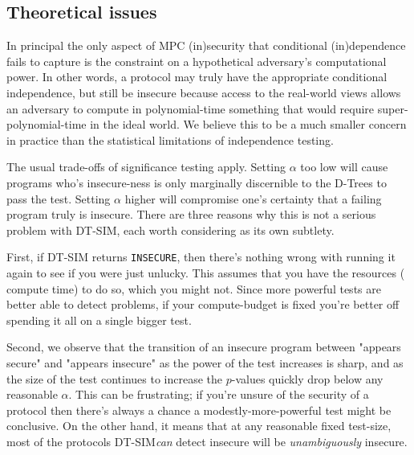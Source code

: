 \documentclass[compsoc, conference, a4paper, 10pt, times]{IEEEtran}
\newcommand{\toolname}{\textsc{DT-SIM}\xspace}
\begin{document}
\subsection{Theoretical issues}

In principal the only aspect of MPC (in)security that conditional (in)dependence fails to capture
is the constraint on a hypothetical adversary's computational power.
In other words, a protocol may truly have the appropriate conditional independence,
but still be insecure because access to the real-world views allows an adversary to compute in polynomial-time
something that would require super-polynomial-time in the ideal world.
We believe this to be a much smaller concern in practice than the statistical limitations of independence testing.

The usual trade-offs of significance testing apply.
Setting $\alpha$ too low will cause programs who's insecure-ness is only marginally discernible to the D-Trees
to pass the test.
Setting $\alpha$ higher will compromise one's certainty that a failing program truly is insecure.
There are three reasons why this is not a serious problem with \toolname, each worth considering as its own subtlety.

First, if \toolname returns \texttt{INSECURE},
then there's nothing wrong with running it again to see if you were just unlucky.
This assumes that you have the resources (\eg{} compute time) to do so, which you might not.
Since more powerful tests are better able to detect problems,
if your compute-budget is fixed you're better off spending it all on a single bigger test.

Second, we observe that the transition of an insecure program between "appears secure" and "appears insecure"
as the power of the test increases is sharp,
and as the size of the test continues to increase the $p$-values quickly drop below any reasonable $\alpha$.
This can be frustrating; if you're unsure of the security of a protocol
then there's always a chance a modestly-more-powerful test might be conclusive.
On the other hand, it means that at any reasonable fixed test-size,
most of the protocols \toolname \textit{can} detect insecure will be \textit{unambiguously} insecure.
\end{document}
